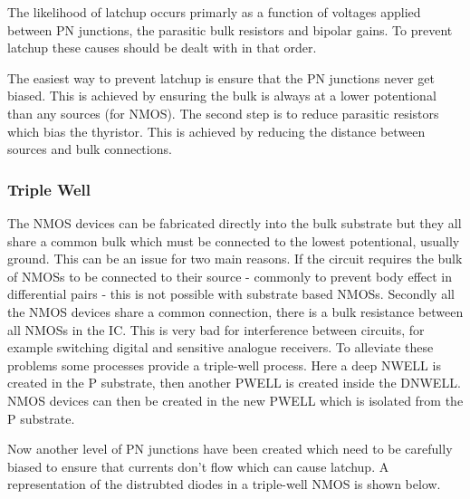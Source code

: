 \documentclass[11pt]{article}
\begin{document}
The likelihood of latchup occurs primarly as a function of voltages applied between PN junctions, the parasitic bulk resistors and bipolar gains. To prevent latchup these causes should be dealt with in that order.

The easiest way to prevent latchup is ensure that the PN junctions never get biased. This is achieved by ensuring the bulk is always at a lower potentional than any sources (for NMOS). The second step is to reduce parasitic resistors which bias the thyristor. This is achieved by reducing the distance between sources and bulk connections.

\subsubsection{Triple Well}

The NMOS devices can be fabricated directly into the bulk substrate but they all share a common bulk which must be connected to the lowest potentional, usually ground. This can be an issue for two main reasons. If the circuit requires the bulk of NMOSs to be connected to their source - commonly to prevent body effect in differential pairs - this is not possible with substrate based NMOSs. Secondly all the NMOS devices share a common connection, there is a bulk resistance between all NMOSs in the IC. This is very bad for interference between circuits, for example switching digital and sensitive analogue receivers. To alleviate these problems some processes provide a triple-well process. Here a deep NWELL is created in the P substrate, then another PWELL is created inside the DNWELL. NMOS devices can then be created in the new PWELL which is isolated from the P substrate.

\begin{figure}[h]
\end{figure}

Now another level of PN junctions have been created which need to be carefully biased to ensure that currents don't flow which can cause latchup. A representation of the distrubted diodes in a triple-well NMOS is shown below.
\end{document}
